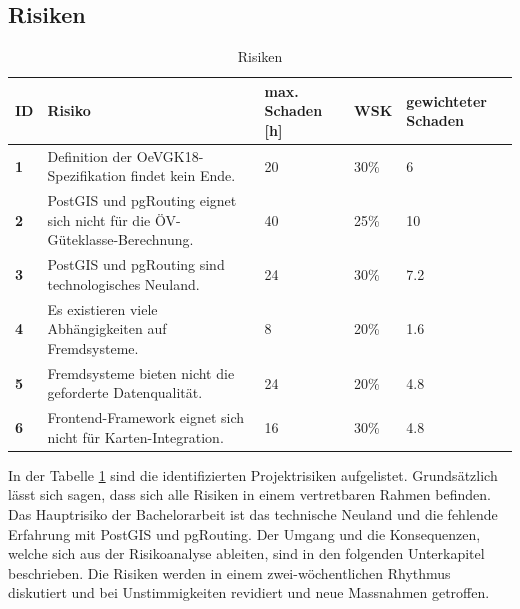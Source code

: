 \subsection{Risiken}
\label{Projektmanagement:Risiken}

\begin{table}[ht]
    \begin{tabular}{p{0.5cm} p{7cm} p{2cm} p{2cm} p{2cm}}
        \toprule
        \textbf{ID}
        & \textbf{Risiko}
        & \textbf{max. Schaden [h]}
        & \textbf{WSK}
        & \textbf{gewichteter Schaden} \\
        \midrule
        \textbf{1}
                        & Definition der \gls{OeVGK18}-Spezifikation findet kein Ende.
                        & 20
                        & 30\%
                        & 6 \\
        \textbf{2}
                        & PostGIS und pgRouting eignet sich nicht für die \acs{ÖV}-Güteklasse-Berechnung.
                        & 40
                        & 25\%
                        & 10 \\
        \textbf{3}
                        & PostGIS und pgRouting sind technologisches Neuland.
                        & 24
                        & 30\%
                        & 7.2 \\
        \textbf{4}
                        & Es existieren viele Abhängigkeiten auf Fremdsysteme.
                        & 8
                        & 20\%
                        & 1.6 \\
        \textbf{5}
                        & Fremdsysteme bieten nicht die geforderte Datenqualität.
                        & 24
                        & 20\%
                        & 4.8 \\
        \textbf{6}
                        & Frontend-Framework eignet sich nicht für Karten-Integration.
                        & 16
                        & 30\%
                        & 4.8 \\
        \bottomrule
    \end{tabular}
    \caption{Risiken}
    \label{table:Risiken}
\end{table}

In der Tabelle \ref{table:Risiken} sind die identifizierten Projektrisiken aufgelistet.
Grundsätzlich lässt sich sagen, dass sich alle Risiken in einem vertretbaren Rahmen befinden.
Das Hauptrisiko der Bachelorarbeit ist das technische Neuland und die fehlende Erfahrung mit PostGIS und pgRouting.
Der Umgang und die Konsequenzen, welche sich aus der Risikoanalyse ableiten, sind in den folgenden Unterkapitel beschrieben.
Die Risiken werden in einem zwei-wöchentlichen Rhythmus diskutiert und bei Unstimmigkeiten revidiert und neue Massnahmen getroffen.

